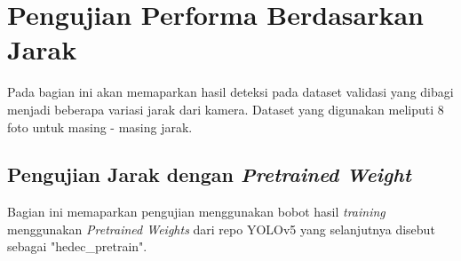 \section{Pengujian Performa Berdasarkan Jarak}
\label{sec:ujiberdasarkanjarak}

Pada bagian ini akan memaparkan hasil deteksi pada dataset validasi yang dibagi menjadi beberapa variasi jarak dari kamera. Dataset yang digunakan meliputi 8 foto untuk masing - masing jarak.

\subsection{Pengujian Jarak dengan \emph{Pretrained Weight}}
\label{subsec:ujijarak_pretrainedweight}

\par Bagian ini memaparkan pengujian menggunakan bobot hasil \emph{training} menggunakan \emph{Pretrained Weights}
dari repo YOLOv5 yang selanjutnya disebut sebagai "hedec\_pretrain". 

